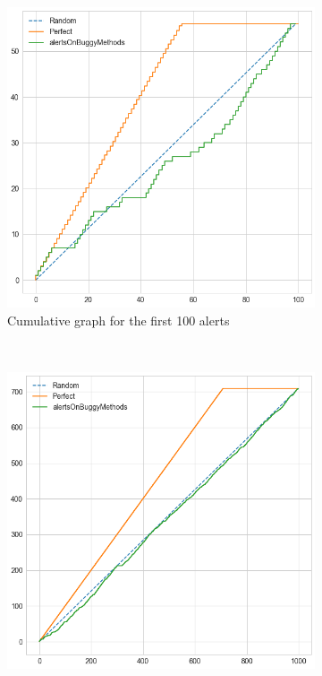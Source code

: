 \begin{figure}[H]
	\begin{subfigure}{\textwidth}
		\centering
		\includegraphics[scale=0.3]{./src/methodBug/methodbug_cumulative_graph_top100.png}
		\caption{Cumulative graph for the first 100 alerts}\label{}
	\end{subfigure}\\
	\begin{subfigure}{.5\textwidth}
		\centering
		\includegraphics[scale=0.3]{./src/methodBug/methodbug_cumulative_graph_top1000.png}

\end{subfigure}
\end{figure}
